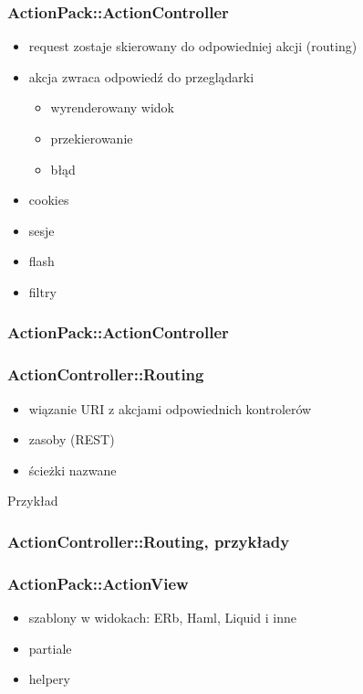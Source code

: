 \documentclass[12t]{beamer}
\begin{document}
\begin{frame}
  \frametitle{ActionPack::ActionController}
  \begin{itemize}
  \item request zostaje skierowany do odpowiedniej akcji (routing)
  \item akcja zwraca odpowiedź do przeglądarki
    \begin{itemize}
    \item wyrenderowany widok
    \item przekierowanie
    \item błąd
    \end{itemize}
  \item cookies
  \item sesje
  \item flash
  \item filtry
  \end{itemize}
\end{frame}

\begin{frame}
  \frametitle{ActionPack::ActionController}
  \begin{small}
  
  \end{small}
\end{frame}

\begin{frame}
  \frametitle{ActionController::Routing}
  \begin{itemize}
  \item wiązanie URI z akcjami odpowiednich kontrolerów
  \item zasoby (REST)
  \item ścieżki nazwane
  \end{itemize}
  \begin{block}{Przykład}
    
  \end{block}
\end{frame}

\begin{frame}
  \frametitle{ActionController::Routing, przykłady}
  \begin{scriptsize}
    
  \end{scriptsize}
\end{frame}


\begin{frame}
  \frametitle{ActionPack::ActionView}
  \begin{itemize}
  \item szablony w widokach: ERb, Haml, Liquid i inne
  \item partiale
  \item helpery
  \end{itemize}
\end{frame}
\end{document}
